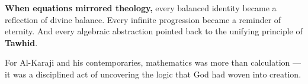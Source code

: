 \begin{tcolorbox}[colback=blue!5!white, colframe=blue!50!black, title={Historical Sidebar: Unity, Infinity, and the Divine Logic of Islamic Mathematics}, breakable]
    \medskip
    
    \textbf{When equations mirrored theology,} every balanced identity became a reflection of divine balance.  Every infinite progression became a reminder of eternity.  And every algebraic abstraction pointed back to the unifying principle of \textbf{Tawhid}.

    \medskip
    
    For Al-Karaji and his contemporaries, mathematics was more than calculation — it was a disciplined act of uncovering the logic that God had woven into creation.
    
\end{tcolorbox}




